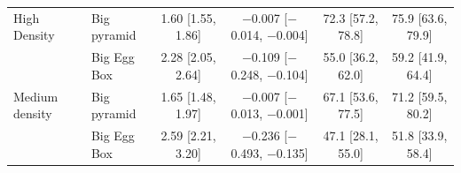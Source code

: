 \begin{table}[H]
\begin{tabular}{l l *{4}{c}}
		\addlinespace
		High Density & Big pyramid & 1.60 [1.55, 1.86] & $-$0.007 [$-$0.014, $-$0.004] & 72.3 [57.2, 78.8] & 75.9 [63.6, 79.9] \\
		 & Big Egg Box & 2.28 [2.05, 2.64] & $-$0.109 [$-$0.248, $-$0.104] & 55.0 [36.2, 62.0] & 59.2 [41.9, 64.4] \\
		\addlinespace
		Medium density & Big pyramid & 1.65 [1.48, 1.97] & $-$0.007 [$-$0.013, $-$0.001] & 67.1 [53.6, 77.5] & 71.2 [59.5, 80.2] \\
		 & Big Egg Box & 2.59 [2.21, 3.20] & $-$0.236 [$-$0.493, $-$0.135] & 47.1 [28.1, 55.0] & 51.8 [33.9, 58.4] \\
		\bottomrule
	\end{tabular}
\end{table}
